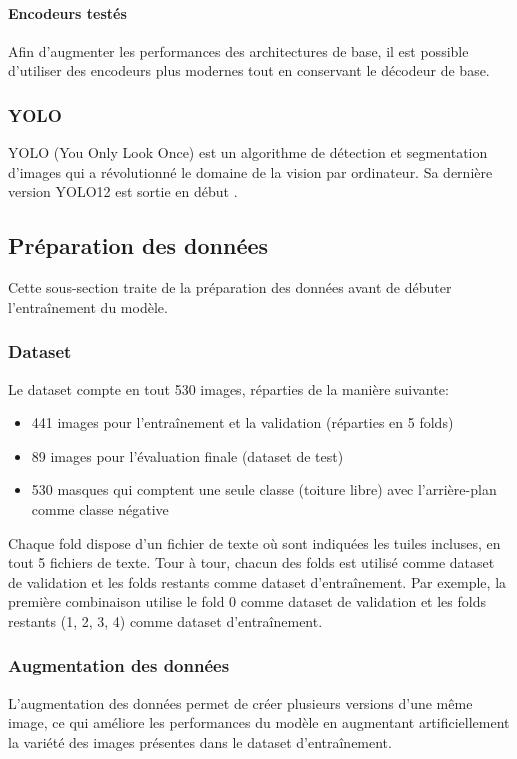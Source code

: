 \paragraph{Encodeurs testés}
Afin d'augmenter les performances des architectures de base, il est possible d'utiliser des encodeurs plus modernes tout en conservant le décodeur de base.

\subsubsection{YOLO}
YOLO (You Only Look Once) est un algorithme de détection et segmentation d'images qui a révolutionné le domaine de la vision par ordinateur. Sa dernière version YOLO12 \cite{tian_yolov12_2025} est sortie en début \citeyear{tian_yolov12_2025}. 

\subsection{Préparation des données} %
Cette sous-section traite de la préparation des données avant de débuter l'entraînement du modèle.
\subsubsection{Dataset}
Le dataset compte en tout 530 images, réparties de la manière suivante:
\begin{itemize}
    \item 441 images pour l'entraînement et la validation (réparties en 5 folds)
    \item 89 images pour l'évaluation finale (dataset de test)
    \item 530 masques qui comptent une seule classe (toiture libre) avec l'arrière-plan comme classe négative
\end{itemize}
Chaque fold dispose d'un fichier de texte où sont indiquées les tuiles incluses, en tout 5 fichiers de texte. Tour à tour, chacun des folds est utilisé comme dataset de validation et les folds restants comme dataset d'entraînement. Par exemple, la première combinaison utilise le fold 0 comme dataset de validation et les folds restants (1, 2, 3, 4) comme dataset d'entraînement.

\subsubsection{Augmentation des données}
L'augmentation des données permet de créer plusieurs versions d'une même image, ce qui améliore les performances du modèle en augmentant artificiellement la variété des images présentes dans le dataset d'entraînement.

